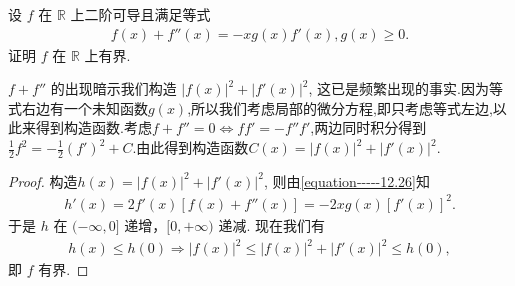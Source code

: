 \documentclass[../../main.tex]{subfiles}%
\begin{document}
\begin{example}
设 $f$ 在 $\mathbb{R}$ 上二阶可导且满足等式
\begin{align}\label{equation-----12.26}
f(x)+f''(x)=-xg(x)f'(x),g(x)\geqslant0.
\end{align}
证明 $f$ 在 $\mathbb{R}$ 上有界.
\end{example}
\begin{note}
$f + f''$ 的出现暗示我们构造 $|f(x)|^2 + |f'(x)|^2$, 这已是频繁出现的事实.因为等式右边有一个未知函数$g(x)$,所以我们考虑局部的微分方程,即只考虑等式左边,以此来得到构造函数.考虑$f+f''=0\Leftrightarrow ff'=-f''f'$,两边同时积分得到$\frac{1}{2}f^2=-\frac{1}{2}(f')^2+C$.由此得到构造函数$C(x)=|f(x)|^2+|f'(x)|^2$.
\end{note}
\begin{proof}

构造$h(x)=|f(x)|^2 + |f'(x)|^2$, 则由\eqref{equation-----12.26}知
\begin{align*}
h'(x)=2f'(x)[f(x)+f''(x)]=-2xg(x)[f'(x)]^2.
\end{align*}
于是 $h$ 在 $(-\infty,0]$ 递增，$[0,+\infty)$ 递减.
现在我们有
\begin{align*}
h(x)\leqslant h(0)\Longrightarrow |f(x)|^2\leqslant |f(x)|^2+|f' (x)|^2\leqslant h(0),
\end{align*}
即 $f$ 有界. 

\end{proof}
\end{document}
